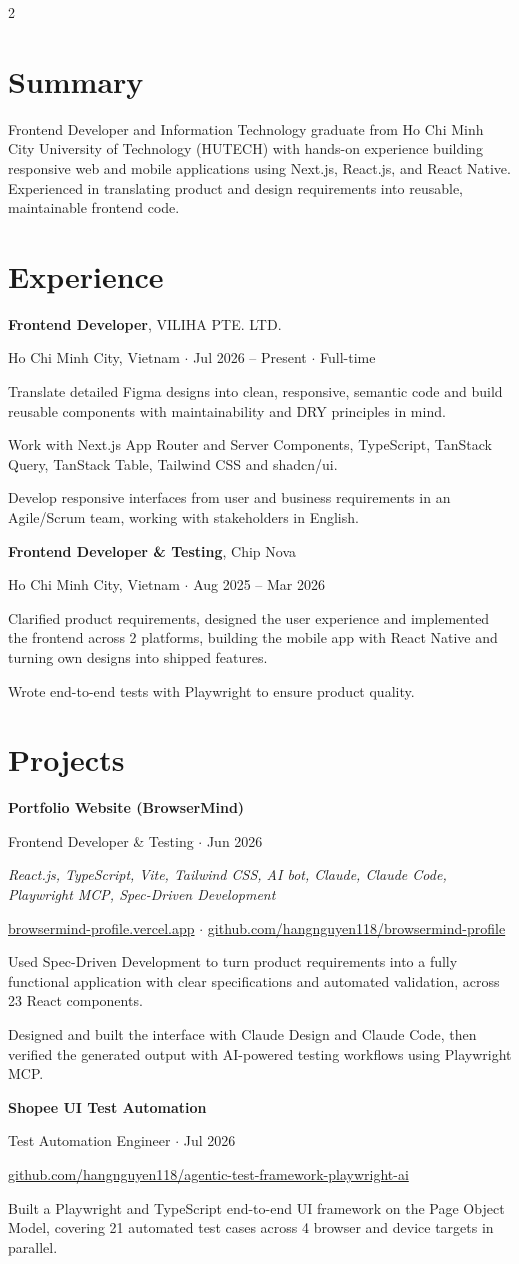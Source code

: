 \documentclass[11pt,a4paper]{article}
\newcommand{\cvsection}[1]{\section*{#1}}
\newcommand{\cvsummary}[1]{#1\par\vspace{0.1em}}
\newcommand{\cvitem}[2]{%
  \vspace{0.3em}%
  #1\par
  {\small\color{muted}#2}\par
}
\newcommand{\cvmeta}[1]{{\small\itshape #1}\par}
\newcommand{\cvlinks}[1]{{\small\color{muted}#1}\par\vspace{0.1em}}
\begin{document}
\begin{paracol}{2}
\switchcolumn
\cvsection{Summary}
\cvsummary{Frontend Developer and Information Technology graduate from Ho Chi Minh City University of Technology (HUTECH) with hands-on experience building responsive web and mobile applications using Next.js, React.js, and React Native. Experienced in translating product and design requirements into reusable, maintainable frontend code.}
\cvsection{Experience}
\cvitem{\textbf{Frontend Developer}, VILIHA PTE. LTD.}{Ho Chi Minh City, Vietnam $\cdot$ Jul 2026 – Present $\cdot$ Full-time}
\begin{cvbullets}
  \item Translate detailed Figma designs into clean, responsive, semantic code and build reusable components with maintainability and DRY principles in mind.
  \item Work with Next.js App Router and Server Components, TypeScript, TanStack Query, TanStack Table, Tailwind CSS and shadcn/ui.
  \item Develop responsive interfaces from user and business requirements in an Agile/Scrum team, working with stakeholders in English.
\end{cvbullets}
\cvitem{\textbf{Frontend Developer \& Testing}, Chip Nova}{Ho Chi Minh City, Vietnam $\cdot$ Aug 2025 – Mar 2026}
\begin{cvbullets}
  \item Clarified product requirements, designed the user experience and implemented the frontend across 2 platforms, building the mobile app with React Native and turning own designs into shipped features.
  \item Wrote end-to-end tests with Playwright to ensure product quality.
\end{cvbullets}
\cvsection{Projects}
\cvitem{\textbf{Portfolio Website (BrowserMind)}}{Frontend Developer \& Testing $\cdot$ Jun 2026}
\cvmeta{React.js, TypeScript, Vite, Tailwind CSS, AI bot, Claude, Claude Code, Playwright MCP, Spec-Driven Development}
\cvlinks{\href{https://browsermind-profile.vercel.app}{browsermind-profile.vercel.app} $\cdot$ \href{https://github.com/hangnguyen118/browsermind-profile}{github.com/hangnguyen118/browsermind-profile}}
\begin{cvbullets}
  \item Used Spec-Driven Development to turn product requirements into a fully functional application with clear specifications and automated validation, across 23 React components.
  \item Designed and built the interface with Claude Design and Claude Code, then verified the generated output with AI-powered testing workflows using Playwright MCP.
\end{cvbullets}
\cvitem{\textbf{Shopee UI Test Automation}}{Test Automation Engineer $\cdot$ Jul 2026}
\cvlinks{\href{https://github.com/hangnguyen118/agentic-test-framework-playwright-ai}{github.com/hangnguyen118/agentic-test-framework-playwright-ai}}
\begin{cvbullets}
  \item Built a Playwright and TypeScript end-to-end UI framework on the Page Object Model, covering 21 automated test cases across 4 browser and device targets in parallel.
\end{cvbullets}

\end{paracol}
\end{document}
